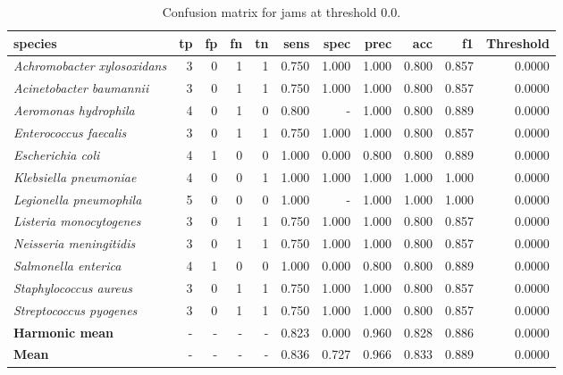 \begin{table}[H]
\centering
\begin{tabular}{lrrrrrrrrrr}
\hline
\textbf{species} & \textbf{tp} & \textbf{fp} & \textbf{fn} & \textbf{tn} & \textbf{sens} & \textbf{spec} & \textbf{prec} & \textbf{acc} & \textbf{f1} & \textbf{Threshold} \\
\hline
\itshape Achromobacter xylosoxidans & 3 & 0 & 1 & 1 & 0.750 & 1.000 & 1.000 & 0.800 & 0.857 & 0.0000 \\
\itshape Acinetobacter baumannii & 3 & 0 & 1 & 1 & 0.750 & 1.000 & 1.000 & 0.800 & 0.857 & 0.0000 \\
\itshape Aeromonas hydrophila & 4 & 0 & 1 & 0 & 0.800 & - & 1.000 & 0.800 & 0.889 & 0.0000 \\
\itshape Enterococcus faecalis & 3 & 0 & 1 & 1 & 0.750 & 1.000 & 1.000 & 0.800 & 0.857 & 0.0000 \\
\itshape Escherichia coli & 4 & 1 & 0 & 0 & 1.000 & 0.000 & 0.800 & 0.800 & 0.889 & 0.0000 \\
\itshape Klebsiella pneumoniae & 4 & 0 & 0 & 1 & 1.000 & 1.000 & 1.000 & 1.000 & 1.000 & 0.0000 \\
\itshape Legionella pneumophila & 5 & 0 & 0 & 0 & 1.000 & - & 1.000 & 1.000 & 1.000 & 0.0000 \\
\itshape Listeria monocytogenes & 3 & 0 & 1 & 1 & 0.750 & 1.000 & 1.000 & 0.800 & 0.857 & 0.0000 \\
\itshape Neisseria meningitidis & 3 & 0 & 1 & 1 & 0.750 & 1.000 & 1.000 & 0.800 & 0.857 & 0.0000 \\
\itshape Salmonella enterica & 4 & 1 & 0 & 0 & 1.000 & 0.000 & 0.800 & 0.800 & 0.889 & 0.0000 \\
\itshape Staphylococcus aureus & 3 & 0 & 1 & 1 & 0.750 & 1.000 & 1.000 & 0.800 & 0.857 & 0.0000 \\
\itshape Streptococcus pyogenes & 3 & 0 & 1 & 1 & 0.750 & 1.000 & 1.000 & 0.800 & 0.857 & 0.0000 \\
\bfseries Harmonic mean & - & - & - & - & 0.823 & 0.000 & 0.960 & 0.828 & 0.886 & 0.0000 \\
\bfseries Mean & - & - & - & - & 0.836 & 0.727 & 0.966 & 0.833 & 0.889 & 0.0000 \\
\end{tabular}
\caption{Confusion matrix for jams at threshold 0.0.}
\label{tab:conf_jams_0.0}
\end{table}
